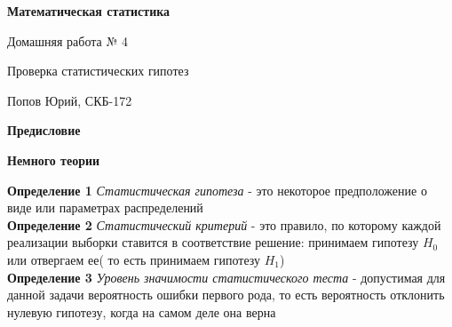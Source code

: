 \documentclass[a4paper,12pt, oneside]{book}
\begin{document}
	\pagestyle{plain}
	
	\begin{titlepage}	
		\begin{center}
			{\Huge \textbf{Математическая статистика}}
			\vspace{30mm}
			
			{\Huge Домашняя работа № 4 \\}
			\vspace{30mm}
			
			{\huge Проверка статистических гипотез}
			\vspace{30mm}
			
			{\Large Попов Юрий, СКБ-172}
		\end{center}
	\end{titlepage}
	
	
	
	\begin{spacing}{0.99}          
		\tableofcontents %
	\end{spacing}

\newpage
\begin{center}
	{\Huge{\bf{Предисловие}}}
\end{center}



\setcounter{secnumdepth}{-1} %


\newpage

\begin{center}
	\textbf{\Large Немного теории}
\end{center}

\normalsize{\textbf{Определение 1}} \textit{ Статистическая гипотеза } - это некоторое предположение о виде или параметрах распределений\\

\normalsize{\textbf{Определение 2}} \textit{ Статистический критерий  } - это правило, по которому каждой реализации выборки ставится в соответствие решение: принимаем гипотезу $ H_0 $ или отвергаем ее( то есть принимаем гипотезу $ H_1 $)\\

\normalsize{\textbf{Определение 3}} \textit{ Уровень значимости статистического теста } - допустимая для данной задачи вероятность ошибки первого рода, то есть вероятность отклонить нулевую гипотезу, когда на самом деле она верна\\
\end{document}
